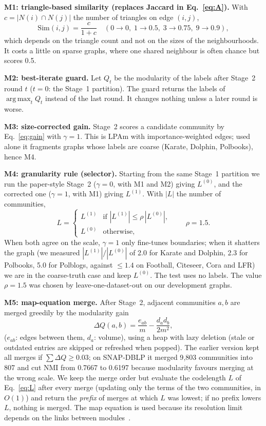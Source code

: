 \documentclass[conference]{IEEEtran}
\DeclareMathOperator*{\argmax}{arg\,max}
\begin{document}
\textbf{M1: triangle-based similarity (replaces Jaccard in Eq.~\eqref{eq:A}).} With $c=|N(i)\cap N(j)|$ the number of triangles on edge $(i,j)$,
\begin{equation}
\mathrm{Sim}(i,j)=\frac{c}{1+c}\quad(0\to0,\;1\to0.5,\;3\to0.75,\;9\to0.9),\label{eq:motif}
\end{equation}
which depends on the triangle count and not on the sizes of the neighbourhoods. It costs a little on sparse graphs, where one shared neighbour is often chance but scores 0.5.

\textbf{M2: best-iterate guard.} Let $Q_t$ be the modularity of the labels after Stage~2 round $t$ ($t=0$: the Stage~1 partition). The guard returns the labels of $\argmax_tQ_t$ instead of the last round. It changes nothing unless a later round is worse.

\textbf{M3: size-corrected gain.} Stage~2 scores a candidate community by Eq.~\eqref{eq:gain} with $\gamma=1$. This is LPAm with importance-weighted edges; used alone it fragments graphs whose labels are coarse (Karate, Dolphin, Polbooks), hence M4.

\textbf{M4: granularity rule (selector).} Starting from the same Stage~1 partition we run the paper-style Stage~2 ($\gamma=0$, with M1 and M2) giving $L^{(0)}$, and the corrected one ($\gamma=1$, with M1) giving $L^{(1)}$. With $|L|$ the number of communities,
\begin{equation}
L=\begin{cases}L^{(1)}&\text{if }|L^{(1)}|\le\rho\,|L^{(0)}|,\\ L^{(0)}&\text{otherwise,}\end{cases}\qquad\rho=1.5.\label{eq:gran}
\end{equation}
When both agree on the scale, $\gamma=1$ only fine-tunes boundaries; when it shatters the graph (we measured $|L^{(1)}|/|L^{(0)}|$ of 2.0 for Karate and Dolphin, 2.3 for Polbooks, 5.0 for Polblogs, against $\le1.4$ on Football, Citeseer, Cora and LFR) we are in the coarse-truth case and keep $L^{(0)}$. The test uses no labels. The value $\rho=1.5$ was chosen by leave-one-dataset-out on our development graphs.

\textbf{M5: map-equation merge.} After Stage~2, adjacent communities $a,b$ are merged greedily by the modularity gain
\begin{equation}
\Delta Q(a,b)=\frac{e_{ab}}{m}-\frac{d_ad_b}{2m^2},\label{eq:dq}
\end{equation}
($e_{ab}$: edges between them, $d_a$: volume), using a heap with lazy deletion (stale or outdated entries are skipped or refreshed when popped). The earlier version kept all merges if $\sum\Delta Q\ge0.03$; on SNAP-DBLP it merged 9{,}803 communities into 807 and cut NMI from 0.7667 to 0.6197 because modularity favours merging at the wrong scale. We keep the merge order but evaluate the codelength $L$ of Eq.~\eqref{eq:L} after every merge (updating only the terms of the two communities, in $O(1)$) and return the \emph{prefix} of merges at which $L$ was lowest; if no prefix lowers $L$, nothing is merged. The map equation is used because its resolution limit depends on the links between modules~\cite{kawamoto2015}.
\end{document}
